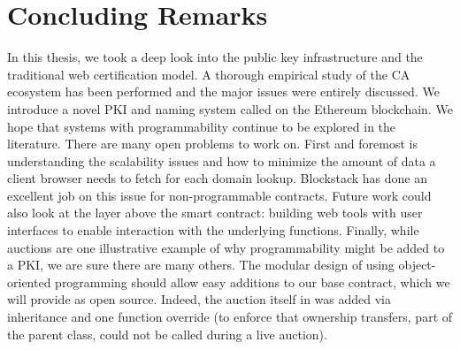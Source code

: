 \chapter{Concluding Remarks}

In this thesis, we took a deep look into the public key infrastructure and the traditional web certification model. A thorough empirical study of the CA ecosystem has been performed and the major issues were entirely discussed. We introduce a novel \UA PKI and naming system called \Ghazalstar on the Ethereum blockchain. We hope that \UA systems with programmability continue to be explored in the literature. There are many open problems to work on. First and foremost is understanding the scalability issues and how to minimize the amount of data a client browser needs to fetch for each domain lookup. Blockstack has done an excellent job on this issue for non-programmable contracts. Future work could also look at the layer above the smart contract: building web tools with user interfaces to enable interaction with the underlying functions. Finally, while auctions are one illustrative example of why programmability might be added to a PKI, we are sure there are many others. The modular design of \Ghazalstar using object-oriented programming should allow easy additions to our base contract, which we will provide as open source. Indeed, the auction itself in \Ghazalstar was added via inheritance and one function override (to enforce that ownership transfers, part of the parent class, could not be called during a live auction).  
